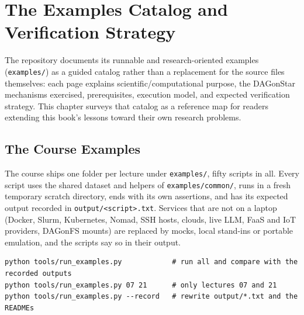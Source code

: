 \chapter{The Examples Catalog and Verification Strategy}
\label{ch:examples-catalog}

The repository documents its runnable and research-oriented examples
(\texttt{examples/}) as a guided catalog rather than a replacement for the
source files themselves: each page explains scientific/computational
purpose, the DAGonStar mechanisms exercised, prerequisites, execution model,
and expected verification strategy. This chapter surveys that catalog as a
reference map for readers extending this book's lessons toward their own
research problems.

\section{The Course Examples}

The course ships one folder per lecture under \texttt{examples/}, fifty
scripts in all. Every script uses the shared dataset and helpers of
\texttt{examples/common/}, runs in a fresh temporary scratch directory,
ends with its own assertions, and has its expected output recorded in
\texttt{output/<script>.txt}. Services that are not on a laptop (Docker,
Slurm, Kubernetes, Nomad, SSH hosts, clouds, live LLM, FaaS and IoT
providers, DAGonFS mounts) are replaced by mocks, local stand-ins or portable
emulation, and the scripts say so in their output.

\begin{lstlisting}[style=bash]
python tools/run_examples.py            # run all and compare with the recorded outputs
python tools/run_examples.py 07 21      # only lectures 07 and 21
python tools/run_examples.py --record   # rewrite output/*.txt and the READMEs
\end{lstlisting}


